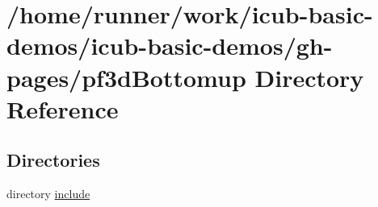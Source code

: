 \section{/home/runner/work/icub-\/basic-\/demos/icub-\/basic-\/demos/gh-\/pages/pf3d\+Bottomup Directory Reference}
\label{dir_e676cb3644873b6bf7df3036a086e762}
\subsection*{Directories}
\begin{DoxyCompactItemize}
\item 
directory \hyperlink{dir_461bc6e266c40caf4deffca7b613e586}{include}
\end{DoxyCompactItemize}
